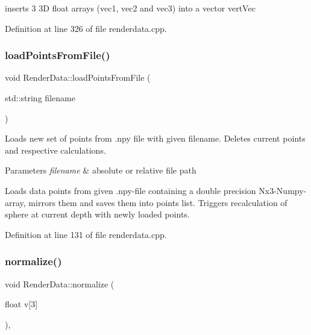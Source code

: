 inserts 3 3D float arrays (vec1, vec2 and vec3) into a vector vert\+Vec 

Definition at line 326 of file renderdata.\+cpp.

\mbox{\label{class_render_data_ac161f29f7d6ae6fd3912e8af7bdccdfd}} 
\subsubsection{\texorpdfstring{load\+Points\+From\+File()}{loadPointsFromFile()}}
{\footnotesize\ttfamily void Render\+Data\+::load\+Points\+From\+File (\begin{DoxyParamCaption}\item[{std\+::string}]{filename }\end{DoxyParamCaption})}

Loads new set of points from .npy file with given filename. Deletes current points and respective calculations. 
\begin{DoxyParams}{Parameters}
{\em filename} & absolute or relative file path\\
\hline
\end{DoxyParams}
Loads data points from given .npy-\/file containing a double precision Nx3-\/\+Numpy-\/array, mirrors them and saves them into points list. Triggers recalculation of sphere at current depth with newly loaded points. 

Definition at line 131 of file renderdata.\+cpp.

\mbox{\label{class_render_data_ad8c590fd11eda06875112a74d318267f}} 
\subsubsection{\texorpdfstring{normalize()}{normalize()}}
{\footnotesize\ttfamily void Render\+Data\+::normalize (\begin{DoxyParamCaption}\item[{float}]{v\mbox{[}3\mbox{]} }\end{DoxyParamCaption})\hspace{0.3cm}{\ttfamily [inline]}, {\ttfamily [private]}}

